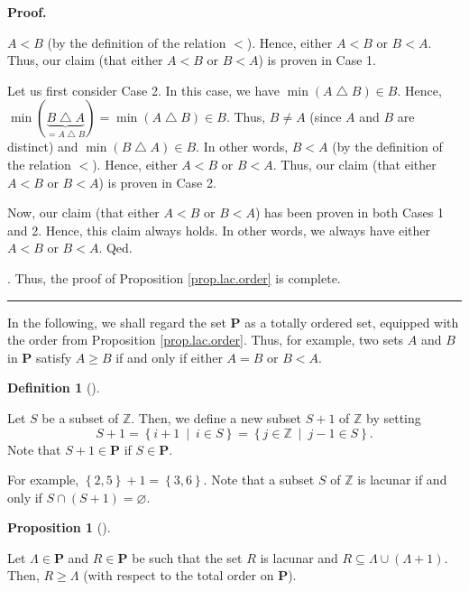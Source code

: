 \documentclass[numbers=enddot,12pt,final,onecolumn,notitlepage]{scrartcl}%
\theoremstyle{definition}
\newtheorem{prop}[theo]{Proposition}
\newenvironment{proposition}[1][]
{\begin{prop}[#1]\begin{leftbar}}
{\end{leftbar}\end{prop}}
\newtheorem{defi}[theo]{Definition}
\newenvironment{definition}[1][]
{\begin{defi}[#1]\begin{leftbar}}
{\end{leftbar}\end{defi}}
\newenvironment{proof}[1][Proof]{\noindent\textbf{#1.} }{\ \rule{0.5em}{0.5em}}
\newenvironment{verlong}{}{}
\begin{document}
\begin{verlong}
\begin{proof}
{$A<B$ (by the definition of the relation $<$). Hence, either $A<B$ or $B<A$.
Thus, our claim (that either $A<B$ or $B<A$) is proven in Case 1.
\par
Let us first consider Case 2. In this case, we have $\min\left(
A\bigtriangleup B\right)  \in B$. Hence, $\min\left(
\underbrace{B\bigtriangleup A}_{=A\bigtriangleup B}\right)  =\min\left(
A\bigtriangleup B\right)  \in B$. Thus, $B\neq A$ (since $A$ and $B$ are
distinct) and $\min\left(  B\bigtriangleup A\right)  \in B$. In other words,
$B<A$ (by the definition of the relation $<$). Hence, either $A<B$ or $B<A$.
Thus, our claim (that either $A<B$ or $B<A$) is proven in Case 2.
\par
Now, our claim (that either $A<B$ or $B<A$) has been proven in both Cases 1
and 2. Hence, this claim always holds. In other words, we always have either
$A<B$ or $B<A$. Qed.}. Thus, the proof of Proposition \ref{prop.lac.order} is complete.
\end{proof}
\end{verlong}

In the following, we shall regard the set $\mathbf{P}$ as a totally ordered
set, equipped with the order from Proposition \ref{prop.lac.order}. Thus, for
example, two sets $A$ and $B$ in $\mathbf{P}$ satisfy $A\geq B$ if and only if
either $A=B$ or $B<A$.

\begin{definition}
\label{def.S+1}Let $S$ be a subset of $\mathbb{Z}$. Then, we define a new
subset $S+1$ of $\mathbb{Z}$ by setting
\[
S+1=\left\{  i+1\ \mid\ i\in S\right\}  =\left\{  j\in\mathbb{Z}\ \mid\ j-1\in
S\right\}  .
\]
Note that $S+1\in\mathbf{P}$ if $S\in\mathbf{P}$.
\end{definition}

For example, $\left\{  2,5\right\}  +1=\left\{  3,6\right\}  $. Note that a
subset $S$ of $\mathbb{Z}$ is lacunar if and only if $S\cap\left(  S+1\right)
=\varnothing$.

\begin{proposition}
\label{prop.lac.RL}Let $\Lambda\in\mathbf{P}$ and $R\in\mathbf{P}$ be such
that the set $R$ is lacunar and $R\subseteq\Lambda\cup\left(  \Lambda
+1\right)  $. Then, $R\geq\Lambda$ (with respect to the total order on
$\mathbf{P}$).
\end{proposition}
\end{document}
